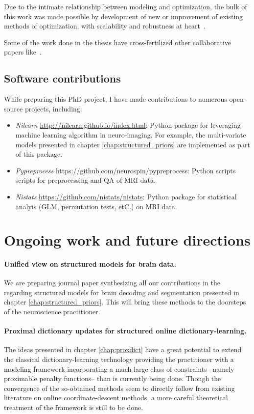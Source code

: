 Due to the intimate relationship between modeling and optimization, the
bulk of this work was made possible by development of new or improvement of existing methods of
optimization, with scalability and robustness at heart~\citep{dohmatob2014benchmarking,dohmatob2015local,varoquaux2015faasta,dohmatob2015simple}.

Some of the work done in the thesis have cross-fertilized other collaborative papers like~\citep{rahim2015integrating,thirion2014fmri}.

\subsection{Software contributions}
While preparing this PhD project, I have made contributions to numerous open-source projects, including:
\begin{itemize}
\item \textit{Nilearn} \url{http://nilearn.github.io/index.html}: Python package for leveraging machine learning algorithm in neuro-imaging. For example, the multi-variate models presented in chapter \ref{chap:structured_priors} are implemented as part of this package.
\item \textit{Pypreprocess} https://github.com/neurospin/pypreprocess: Python scripts scripts for preprocessing and QA of MRI data.
\item \textit{Nistats} \url{https://github.com/nistats/nistats}: Python package for statistical analyis (GLM, permutation tests, etC.) on MRI data.
\end{itemize}
    

\section{Ongoing work and future directions}
\paragraph{Unified view on structured models for brain data.}
We are preparing journal paper synthesizing all our contributions in the regarding structured models for brain decoding and segmentation presented in chapter \ref{chap:structured_priors}. This will bring these methods to the doorsteps of the neuroscience practitioner.
\paragraph{Proximal dictionary updates for structured online dictionary-learning.}
The ideas presented in chapter \ref{chap:proxdict} have a great potential to extend the classical dictionary-learning technology providing the practitioner with a modeling framework incorporating
a much large class of constraints --namely proximable penalty functions-- than is currently being done. Though the convergence of the so-obtained methods seem to directly follow from existing literature on online coordinate-descent methods, a more careful theoretical treatment of the framework is still to be done.
